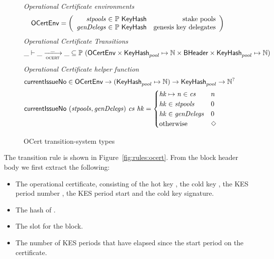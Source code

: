 \begin{figure}
  \emph{Operational Certificate environments}
  \begin{equation*}
    \OCertEnv =
    \left(
      \begin{array}{r@{~\in~}lr}
        \var{stpools} & \powerset{\type{KeyHash}} & \text{stake pools} \\
        \var{genDelegs} & \powerset{\type{KeyHash}} & \text{genesis key delegates}\\
      \end{array}
    \right)
  \end{equation*}
  \emph{Operational Certificate Transitions}
  \begin{equation*}
    \var{\_} \vdash \var{\_} \trans{ocert}{\_} \var{\_} \subseteq
    \powerset (\OCertEnv \times \KeyHash_{pool} \mapsto \N \times \BHeader \times \KeyHash_{pool} \mapsto \N)
  \end{equation*}
  \emph{Operational Certificate helper function}
  \begin{align*}
      & \mathsf{currentIssueNo} \in \mathsf{OCertEnv} \to (\mathsf{KeyHash}_{pool} \mapsto \mathbb{N})
                                           \to \mathsf{KeyHash}_{pool}
                                           \to \mathbb{N}^? \\
      & \mathsf{currentIssueNo}~(\mathit{stpools}, \mathit{genDelegs})~ \mathit{cs} ~\mathit{hk} =
      \begin{cases}
        \mathit{hk}\mapsto \mathit{n} \in \mathit{cs} & n \\
        \mathit{hk} \in \mathit{stpools} & 0 \\
        \mathit{hk} \in \mathit{genDelegs} & 0 \\
        \text{otherwise} & \Diamond
      \end{cases}
  \end{align*}
  \caption{OCert transition-system types}
  \label{fig:ts-types:ocert}
\end{figure}

The transition rule is shown in Figure~\ref{fig:rules:ocert}. From the block
header body  we first extract the following:

\begin{itemize}
  \item The operational certificate, consisting of the hot key , the cold key
    , the KES period number , the KES period start  and the cold key
  signature.
\item The hash  of .
\item The slot  for the block.
\item The number of KES periods that have elapsed since the start period on the certificate.
\end{itemize}


